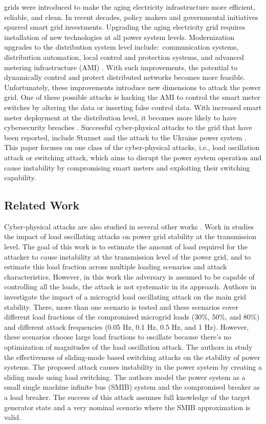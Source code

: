 \documentclass[journal]{IEEEtran}
\begin{document}
 grids were introduced to make the aging electricity infrastructure more efficient, reliable, and clean. In recent decades, policy makers and governmental initiatives spurred smart grid investments. Upgrading the aging electricity grid requires installation of new technologies at all power system levels. Modernization upgrades to the distribution system level include:~communication systems, distribution automation, local control and protection systems, and advanced metering infrastructure (AMI) \cite{EPRI}. With such improvements, the potential to dynamically control and protect distributed networks becomes more feasible. Unfortunately, these improvements introduce new dimensions to attack the power grid. One of these possible attacks is hacking the AMI to control the smart meter switches by altering the data or inserting false control data. With increased smart meter deployment at the distribution level, it becomes more likely to have cybersecurity breaches \cite{SM1,vulnerability,SM2}. Successful cyber-physical attacks to the grid that have been reported, include Stuxnet \cite{stuxnet} and the attack to the Ukraine power system \cite{Ukrain}. This paper focuses on one class of the cyber-physical attacks, i.e., load oscillation attack or switching attack, which aims to disrupt the power system operation and cause instability by compromising smart meters and exploiting their switching capability. 


\subsection{Related Work}

Cyber-physical attacks are also studied in several other works \cite{Anu,carter,6089026}. Work in \cite{Anu} studies the impact of load oscillating attacks on power grid stability at the transmission level. The goal of this work is to estimate the amount of load required for the attacker to cause instability at the transmission level of the power grid, and to estimate this load fraction across multiple loading scenarios and attack characteristics. However, in this work the adversary is assumed to be capable of controlling all the loads, the attack is not systematic in its approach.
Authors in \cite{carter} investigate the impact of a microgrid load oscillating attack on the main grid stability. There, more than one scenario is tested and these scenarios cover different load fractions of the compromised microgrid loads (30\%, 50\%, and 80\%) and different attack frequencies (0.05 Hz, 0.1 Hz, 0.5 Hz, and 1 Hz). However, these scenarios choose large load fractions to oscillate because there's no optimization of magnitudes %
of the load oscillation attack.
The authors in \cite{6089026} study the effectiveness of sliding-mode based switching attacks on the stability of power systems. The proposed attack causes instability in the power system by creating a sliding mode using load switching. The authors model the power system as a small single machine infinite bus (SMIB) system and the compromised breaker as a load breaker. The success of this attack assumes full knowledge of the target generator state and a very nominal scenario where the SMIB approximation is valid. 
\end{document}
